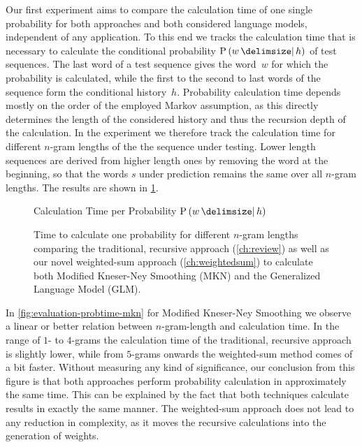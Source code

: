Our first experiment aims to compare the calculation time of one single
probability for both approaches and both considered language models, independent
of any application.
To this end we tracks the calculation time that is necessary to calculate
the conditional probability $\Prob{w}{h}$ of test sequences.
The last word of a test sequence gives the word~$w$ for which the probability is
calculated, while the first to the second to last words of the sequence form
the conditional history~$h$.
Probability calculation time depends mostly on the order of the employed Markov
assumption, as this directly determines the length of the considered history
and thus the recursion depth of the calculation.
In the experiment we therefore track the calculation time for different
$n$-gram lengths of the the sequence under testing.
Lower length sequences are derived from higher length ones by removing the
word at the beginning, so that the words $s$ under prediction remains the same
over all $n$-gram lengths.
The results are shown in \cref{fig:evaluation-probtime}.

\begin{figure}
  \begin{center}
    Calculation Time per Probability $\Prob{w}{h}$
  \end{center}

  \hspace{-0.21\textwidth}
  \caption{Time to calculate one probability for different $n$-gram lengths
    comparing the traditional, recursive approach (\cref{ch:review}) as well as
    our novel weighted-sum approach (\cref{ch:weightedsum}) to calculate both
    Modified Kneser-Ney Smoothing (MKN) and the Generalized Language Model
    (GLM).}
  \label{fig:evaluation-probtime}
\end{figure}

In \cref{fig:evaluation-probtime-mkn} for Modified Kneser-Ney Smoothing we
observe a linear or better relation between $n$-gram-length and calculation
time.
In the range of $1$- to $4$-grams the calculation time of the traditional,
recursive approach is slightly lower, while from $5$-grams onwards the
weighted-sum method comes of a bit faster.
Without measuring any kind of significance, our conclusion from this figure is
that both approaches perform probability calculation in approximately the same
time.
This can be explained by the fact that both techniques calculate results in
exactly the same manner.
The weighted-sum approach does not lead to any reduction in complexity, as it
moves the recursive calculations into the generation of weights.

